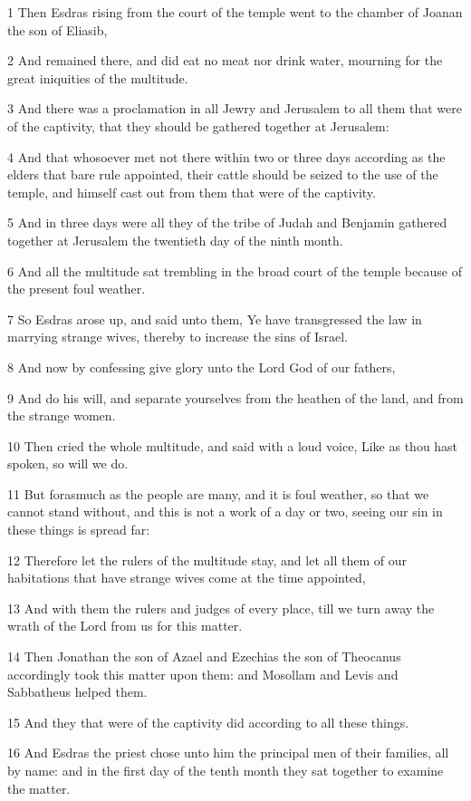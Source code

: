 \par 1 Then Esdras rising from the court of the temple went to the chamber of Joanan the son of Eliasib,
\par 2 And remained there, and did eat no meat nor drink water, mourning for the great iniquities of the multitude.
\par 3 And there was a proclamation in all Jewry and Jerusalem to all them that were of the captivity, that they should be gathered together at Jerusalem:
\par 4 And that whosoever met not there within two or three days according as the elders that bare rule appointed, their cattle should be seized to the use of the temple, and himself cast out from them that were of the captivity.
\par 5 And in three days were all they of the tribe of Judah and Benjamin gathered together at Jerusalem the twentieth day of the ninth month.
\par 6 And all the multitude sat trembling in the broad court of the temple because of the present foul weather.
\par 7 So Esdras arose up, and said unto them, Ye have transgressed the law in marrying strange wives, thereby to increase the sins of Israel.
\par 8 And now by confessing give glory unto the Lord God of our fathers,
\par 9 And do his will, and separate yourselves from the heathen of the land, and from the strange women.
\par 10 Then cried the whole multitude, and said with a loud voice, Like as thou hast spoken, so will we do.
\par 11 But forasmuch as the people are many, and it is foul weather, so that we cannot stand without, and this is not a work of a day or two, seeing our sin in these things is spread far:
\par 12 Therefore let the rulers of the multitude stay, and let all them of our habitations that have strange wives come at the time appointed,
\par 13 And with them the rulers and judges of every place, till we turn away the wrath of the Lord from us for this matter.
\par 14 Then Jonathan the son of Azael and Ezechias the son of Theocanus accordingly took this matter upon them: and Mosollam and Levis and Sabbatheus helped them.
\par 15 And they that were of the captivity did according to all these things.
\par 16 And Esdras the priest chose unto him the principal men of their families, all by name: and in the first day of the tenth month they sat together to examine the matter.
